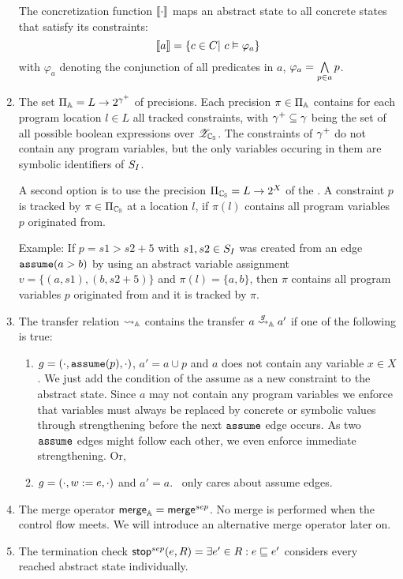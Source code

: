\begin{enumerate}[leftmargin=*,label=\arabic*.]
	The concretization function $\llbracket \cdot \rrbracket$ maps an abstract state to all concrete states that satisfy its constraints:
	\[ \llbracket a \rrbracket = \{ c \in C |\ c \vDash \varphi_a \} \]
	with $\varphi_a$ denoting the conjunction of all predicates in $a$, $\varphi_a = \bigwedge\limits_{p \in a} p$.

\item
The set $\Pi_{\mathbb{A}} = L \rightarrow 2^{{\gamma^+}}$ of precisions. Each precision $\pi \in \Pi_{\mathbb{A}}$ contains for each program location $l \in L$ all tracked constraints, with ${\gamma^+} \subseteq \gamma$ being the set of all possible boolean expressions over ${\mathscr{Z}_{\mathbb{C_{S}}}}$.
The constraints of ${\gamma^+}$ do not contain any program variables, but the only variables occuring in them are symbolic identifiers of $S_I$.

A second option is to use the precision $\Pi_{\mathbb{C_{S}}} = L \rightarrow 2^X$ of the \symbolicValueAnalysisCPA.
A constraint $p$ is tracked by $\pi \in \Pi_{\mathbb{C_{S}}}$ at a location $l$, if $\pi(l)$ contains all program variables $p$ originated from.

Example: If $p = s1 > s2 + 5$ with $s1, s2 \in S_I$ was created from an edge $\texttt{assume}(a > b)$ by using an abstract variable assignment $v = \{ (a, s1), (b, s2 + 5) \}$
and $\pi(l) = \{ a, b \}$, then $\pi$ contains all program variables $p$ originated from and it is tracked by $\pi$. 

\item The transfer relation $\rightsquigarrow_{\mathbb{A}}$ contains the transfer $a \overset{g}{\rightsquigarrow}_{\mathbb{A}} a'$ if one of the following is true:
	\begin{enumerate}[label=\alph*)]
		\item $g = (\cdot, \texttt{assume}(p), \cdot)$, $a' = a \cup p$ and
			$a$ does not contain any variable $x \in X$.
			We just add the condition of the assume as a new constraint to the abstract state.
			Since $a$ may not contain any program variables we enforce that
			variables must always be replaced by concrete or symbolic values through strengthening before the next $\texttt{assume}$ edge occurs.
			As two $\texttt{assume}$ edges might follow each other, we even enforce immediate strengthening.
			Or,
		\item $g = (\cdot, w := e, \cdot)$ and $a' = a$. \ConstraintsCPA\ only cares about assume edges.
	\end{enumerate}
	
\item The merge operator $\operatorname{\operatorname{\mathsf{merge}}}_{\mathbb{A}} = \operatorname{\operatorname{\mathsf{merge}}}^{sep}$. No merge is performed when the control flow meets. We will introduce an alternative merge operator later on.
\item The termination check $\operatorname{\operatorname{\mathsf{stop}}}^{sep}(e, R) = \exists e' \in R: e \sqsubseteq e'$ considers every reached abstract state individually.


\end{enumerate}
